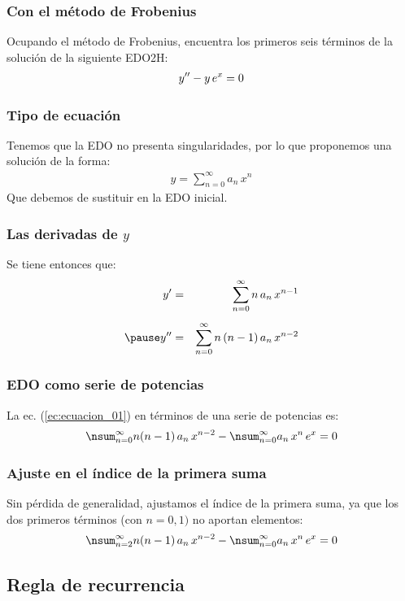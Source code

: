 \documentclass[12pt]{beamer}
\begin{document}
\begin{frame}
\frametitle{Con el método de Frobenius}
Ocupando el método de Frobenius, encuentra los primeros seis términos de la solución de la siguiente EDO2H:
\pause
\begin{align}
{y}^{\prime \prime} - y \, e^{x} = 0
\label{ec:ecuacion_01}
\end{align}
\end{frame}
\begin{frame}
\frametitle{Tipo de ecuación}
Tenemos que la EDO no presenta singularidades, por lo que proponemos una solución de la forma:
\pause
\begin{align*}
y = \sum_{n=0}^{\infty} a_{n} \, x^{n}
\end{align*}
\pause
Que debemos de sustituir en la EDO inicial.
\end{frame}
\begin{frame}
\frametitle{Las derivadas de $y$}
Se tiene entonces que:
\begin{eqnarray*}
\ptilde{y} &=& \sum_{n=0}^{\infty} n \, a_{n} \, x^{n-1} \\[0.5em] \pause
\stilde{y} &=& \sum_{n=0}^{\infty} n \, (n - 1) \, a_{n} \, x^{n-2}
\end{eqnarray*}
\end{frame}
\begin{frame}
\frametitle{EDO como serie de potencias}
La ec. (\ref{ec:ecuacion_01}) en términos de una serie de potencias es:
\pause
\begin{align}
\nsum_{n=0}^{\infty} n( n - 1) \, a_{n} \, x^{n-2} -  \nsum_{n=0}^{\infty} a_{n} \, x^{n} \, e^{x} = 0
\end{align}
\end{frame}
\begin{frame}
\frametitle{Ajuste en el índice de la primera suma}
Sin pérdida de generalidad, ajustamos el índice de la primera suma, ya que los dos primeros términos (con $n= 0, 1)$ no aportan elementos:
\pause
\begin{align}
\nsum_{n=2}^{\infty} n( n - 1) \, a_{n} \, x^{n-2} - \nsum_{n=0}^{\infty} a_{n} \, x^{n} \, e^{x} = 0
\end{align}
\end{frame}

\subsection{Regla de recurrencia}
\end{document}
